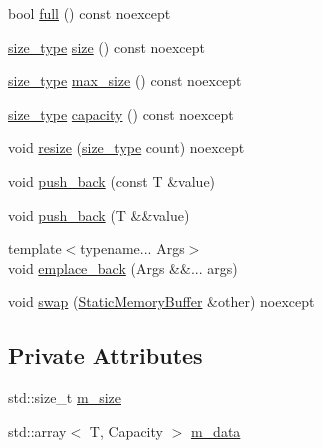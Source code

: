 \begin{DoxyCompactItemize}
bool \mbox{\hyperlink{classmage_1_1_static_memory_buffer_a5ddee6fdf33505dbc2460a3c11fc3b83}{full}} () const noexcept
\item 
\mbox{\hyperlink{classmage_1_1_static_memory_buffer_a13e19b7af61a49400c5be360f09aadc8}{size\+\_\+type}} \mbox{\hyperlink{classmage_1_1_static_memory_buffer_a9c39b1c5999312a6701e8db0ed4ca82e}{size}} () const noexcept
\item 
\mbox{\hyperlink{classmage_1_1_static_memory_buffer_a13e19b7af61a49400c5be360f09aadc8}{size\+\_\+type}} \mbox{\hyperlink{classmage_1_1_static_memory_buffer_a6f914dbb9951aa79543dbc9959e863d0}{max\+\_\+size}} () const noexcept
\item 
\mbox{\hyperlink{classmage_1_1_static_memory_buffer_a13e19b7af61a49400c5be360f09aadc8}{size\+\_\+type}} \mbox{\hyperlink{classmage_1_1_static_memory_buffer_ab24faf477d7c1613894b73e0aa87eda7}{capacity}} () const noexcept
\item 
void \mbox{\hyperlink{classmage_1_1_static_memory_buffer_a8b0ee58cf5454f1998cfc50076cef1de}{resize}} (\mbox{\hyperlink{classmage_1_1_static_memory_buffer_a13e19b7af61a49400c5be360f09aadc8}{size\+\_\+type}} count) noexcept
\item 
void \mbox{\hyperlink{classmage_1_1_static_memory_buffer_a5a9ef7074b08f165f84b0745422a91d2}{push\+\_\+back}} (const T \&value)
\item 
void \mbox{\hyperlink{classmage_1_1_static_memory_buffer_a4ad4e04f5560da9f1948c2791e51e5f5}{push\+\_\+back}} (T \&\&value)
\item 
{\footnotesize template$<$typename... Args$>$ }\\void \mbox{\hyperlink{classmage_1_1_static_memory_buffer_a94ffcbf78b315a65ead94d6d2cf9848d}{emplace\+\_\+back}} (Args \&\&... args)
\item 
void \mbox{\hyperlink{classmage_1_1_static_memory_buffer_a2e0940b76a3913d872a90de48a1ab165}{swap}} (\mbox{\hyperlink{classmage_1_1_static_memory_buffer}{Static\+Memory\+Buffer}} \&other) noexcept
\end{DoxyCompactItemize}
\subsection*{Private Attributes}
\begin{DoxyCompactItemize}
\item 
std\+::size\+\_\+t \mbox{\hyperlink{classmage_1_1_static_memory_buffer_a50075b4c8c9d19bd51d32525162470ad}{m\+\_\+size}}
\item 
std\+::array$<$ T, Capacity $>$ \mbox{\hyperlink{classmage_1_1_static_memory_buffer_a6259631e14e48f322a2c16bc8d73031f}{m\+\_\+data}}
\end{DoxyCompactItemize}


